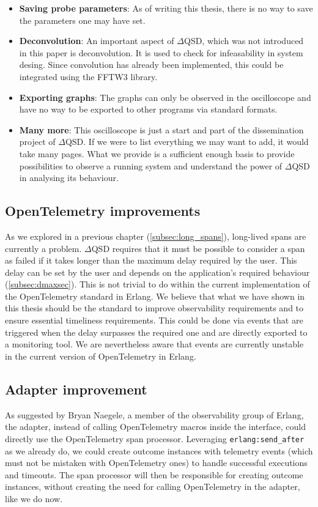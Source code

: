 \begin{itemize}
                \item \textbf{Saving probe parameters}: As of writing this thesis, there is no way to save the parameters one may have set. 
           
                \item \textbf{Deconvolution}: An important aspect of $\Delta$QSD, which was not introduced in this paper is deconvolution. It is used to check for infeasability in system desing. Since convolution has already been implemented, this could be integrated using the FFTW3 library. 

                \item \textbf{Exporting graphs}: The graphs can only be observed in the oscilloscope and have no way to be exported to other programs via standard formats.

                \item \textbf{Many more}: This oscilloscope is just a start and part of the dissemination project of $\Delta$QSD. If we were to list everything we may want to add, it would take many pages. What we provide is a sufficient enough basis to provide possibilities to observe a running system and understand the power of $\Delta$QSD in analysing its behaviour.
           \end{itemize} 
                
      \subsection{OpenTelemetry improvements}
        As we explored in a previous chapter (\cref{subsec:long_spans}), long-lived spans are currently a problem. $\Delta$QSD requires that it must be possible to consider a span as failed if it takes longer than the maximum delay required by the user. This delay can be set by the user and depends on the application's required behaviour (\cref{subsec:dmaxsec}). This is not trivial to do within the current implementation of the OpenTelemetry standard in Erlang. We believe that what we have shown in this thesis should be the standard to improve observability requirements and to ensure essential timeliness requirements. This could be done via events that are triggered when the delay surpasses the required one and are directly exported to a monitoring tool. We are nevertheless aware that events are currently unstable in the current version of OpenTelemetry in Erlang.

        \subsection{Adapter improvement}
         As suggested by Bryan Naegele, a member of the observability group of Erlang, the adapter, instead of calling OpenTelemetry macros inside the interface, could directly use the OpenTelemetry span processor. Leveraging \texttt{erlang:send\_after} as we already do, we could create outcome instances with telemetry \cite{telem-erl} events (which must not be mistaken with OpenTelemetry ones) to handle successful executions and timeouts. The span processor will then be responsible for creating outcome instances, without creating the need for calling OpenTelemetry in the adapter, like we do now.
   
